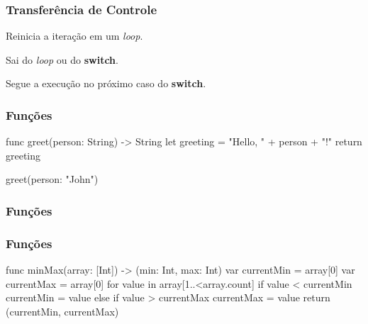 \begin{frame}[fragile]
    \frametitle{Transferência de Controle}

    \begin{description}[leftmargin=!,labelwidth=\widthof{\bfseries fallthrough}]
        \item[continue] Reinicia a iteração em um \textit{loop}.
        \item[break] Sai do \textit{loop} ou do \textbf{switch}.
        \item[fallthrough] Segue a execução no próximo caso do \textbf{switch}.
    \end{description}
\end{frame}

\begin{frame}[fragile]
    \frametitle{Funções}

    \begin{swift}
        func greet(person: String) -> String {
            let greeting = "Hello, " + person + "!"
            return greeting
        }

        greet(person: "John")
    \end{swift}
\end{frame}

\begin{frame}[fragile]
    \frametitle{Funções}

\end{frame}

\begin{frame}[fragile]
    \frametitle{Funções}

    \begin{swift}[basicstyle=\small]
        func minMax(array: [Int]) -> (min: Int, max: Int) {
            var currentMin = array[0]
            var currentMax = array[0]
            for value in array[1..<array.count] {
                if value < currentMin {
                    currentMin = value
                } else if value > currentMax {
                    currentMax = value
                }
            }
            return (currentMin, currentMax)
        }
    \end{swift}
\end{frame}

